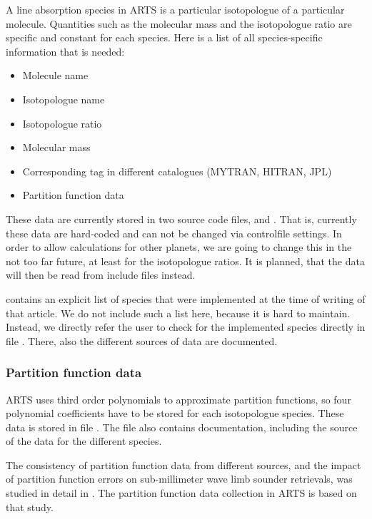 A line absorption species in ARTS is a particular isotopologue of a
particular molecule.  Quantities such as the molecular mass and the
isotopologue ratio are specific and constant for each species.  Here is a
list of all species-specific information that is needed:
\begin{itemize}
\item Molecule name
\item Isotopologue name
\item Isotopologue ratio
\item Molecular mass
\item Corresponding tag in different catalogues (MYTRAN, HITRAN, JPL)
\item Partition function data
\end{itemize}

These data are currently stored in two source code files,
 and . 
That is, currently these data are hard-coded and can not be changed via
controlfile settings.
In order to allow calculations for other planets, we are going to change
this in the not too far future, at least for the isotopologue ratios. It is
planned, that the data will then be read from include files instead.

\citet{buehler:artst:05} contains an explicit list of species that
were implemented at the time of writing of that article.  We do not include
such a list here, because it is hard to maintain. Instead, we directly refer
the user to check for the implemented species directly in file
. There, also the different sources of data
are documented.

\subsubsection{Partition function data}

ARTS uses third order polynomials to approximate partition functions,
so four polynomial coefficients have to be stored for each isotopologue
species. These data is stored in file
. The file also contains
documentation, including the source of the data for the different species.

The consistency of partition function data from different sources, and
the impact of partition function errors on sub-millimeter wave limb
sounder retrievals, was studied in detail in \citet{cverdes:05}. The
partition function data collection in ARTS is based on that study.

